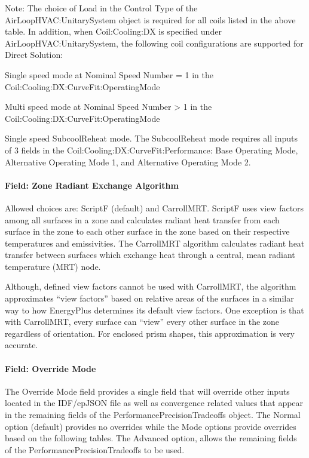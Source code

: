 Note: The choice of Load in the Control Type of the AirLoopHVAC:UnitarySystem object is required for all coils listed in the above table.
In addition, when Coil:Cooling:DX is specified under AirLoopHVAC:UnitarySystem, the following coil configurations are supported for Direct Solution:

	Single speed mode at Nominal Speed Number = 1 in the Coil:Cooling:DX:CurveFit:OperatingMode

	Multi speed mode at Nominal Speed Number > 1 in the Coil:Cooling:DX:CurveFit:OperatingMode

	Single speed SubcoolReheat mode. The SubcoolReheat mode requires all inputs of 3 fields in the Coil:Cooling:DX:CurveFit:Performance: Base Operating Mode, Alternative Operating Mode 1, and Alternative Operating Mode 2.

\paragraph{Field: Zone Radiant Exchange Algorithm}\label{zone-radiant-exchange-algorithm}

Allowed choices are: ScriptF (default) and CarrollMRT. ScriptF uses view factors among all surfaces in a zone and calculates radiant heat transfer from each surface in the zone to each other surface in the zone based on their respective temperatures and emissivities. The CarrollMRT algorithm calculates radiant heat transfer between surfaces which exchange heat through a central, mean radiant temperature (MRT) node.

Although, defined view factors cannot be used with CarrollMRT, the algorithm approximates ``view factors'' based on relative areas of the surfaces in a similar way to how EnergyPlus determines its default view factors. One exception is that with CarrollMRT, every surface can ``view'' every other surface in the zone regardless of orientation. For enclosed prism shapes, this approximation is very accurate.

\paragraph{Field: Override Mode}\label{override-mode}

The Override Mode field provides a single field that will override other inputs located in the IDF/epJSON file as well as convergence related values that appear in the remaining fields of the PerformancePrecisionTradeoffs object. The Normal option (default) provides no overrides while the Mode options provide overrides based on the following tables. The Advanced option, allows the remaining fields of the PerformancePrecisionTradeoffs to be used.

